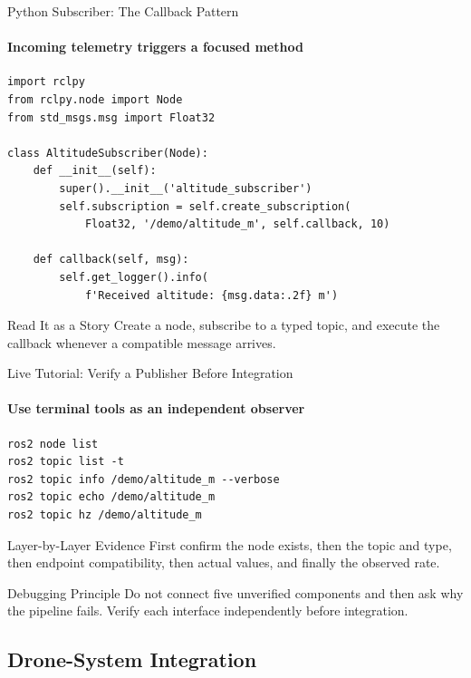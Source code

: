 \begin{frame}[fragile]{Python Subscriber: The Callback Pattern}
\framesubtitle{Incoming telemetry triggers a focused method}
\scriptsize
\begin{verbatim}
import rclpy
from rclpy.node import Node
from std_msgs.msg import Float32

class AltitudeSubscriber(Node):
    def __init__(self):
        super().__init__('altitude_subscriber')
        self.subscription = self.create_subscription(
            Float32, '/demo/altitude_m', self.callback, 10)

    def callback(self, msg):
        self.get_logger().info(
            f'Received altitude: {msg.data:.2f} m')
\end{verbatim}
\begin{block}{Read It as a Story}
Create a node, subscribe to a typed topic, and execute the callback whenever a compatible message arrives.
\end{block}
\end{frame}

\begin{frame}[fragile]{Live Tutorial: Verify a Publisher Before Integration}
\framesubtitle{Use terminal tools as an independent observer}
\begin{verbatim}
ros2 node list
ros2 topic list -t
ros2 topic info /demo/altitude_m --verbose
ros2 topic echo /demo/altitude_m
ros2 topic hz /demo/altitude_m
\end{verbatim}
\begin{exampleblock}{Layer-by-Layer Evidence}
First confirm the node exists, then the topic and type, then endpoint compatibility, then actual values, and finally the observed rate.
\end{exampleblock}
\begin{alertblock}{Debugging Principle}
Do not connect five unverified components and then ask why the pipeline fails. Verify each interface independently before integration.
\end{alertblock}
\end{frame}

\subsection{Drone-System Integration}

